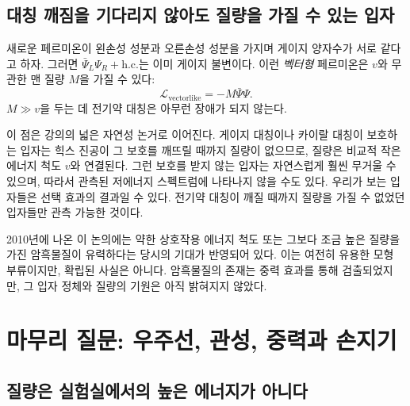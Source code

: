 \subsection{대칭 깨짐을 기다리지 않아도 질량을 가질 수 있는 입자}

새로운 페르미온이 왼손성 성분과 오른손성 성분을 가지며 게이지 양자수가 서로 같다고 하자. 그러면
\(\bar\Psi_L\Psi_R+\mathrm{h.c.}\)는 이미 게이지 불변이다. 이런 \emph{벡터형} 페르미온은 \(v\)와 무관한 맨 질량 \(M\)을 가질 수 있다:
\begin{equation}
  \mathcal L_{\mathrm{vectorlike}}
  =-M\bar\Psi\Psi.
  \label{eq:l09-vectorlike-mass}
\end{equation}
\(M\gg v\)을 두는 데 전기약 대칭은 아무런 장애가 되지 않는다.

이 점은 강의의 넓은 자연성 논거로 이어진다. 게이지 대칭이나 카이랄 대칭이 보호하는 입자는 힉스 진공이 그 보호를 깨뜨릴 때까지 질량이 없으므로, 질량은 비교적 작은 에너지 척도 \(v\)와 연결된다. 그런 보호를 받지 않는 입자는 자연스럽게 훨씬 무거울 수 있으며, 따라서 관측된 저에너지 스펙트럼에 나타나지 않을 수도 있다. 우리가 보는 입자들은 선택 효과의 결과일 수 있다. 전기약 대칭이 깨질 때까지 질량을 가질 수 없었던 입자들만 관측 가능한 것이다.

\begin{classroomqa}
\end{classroomqa}

2010년에 나온 이 논의에는 약한 상호작용 에너지 척도 또는 그보다 조금 높은 질량을 가진 암흑물질이 유력하다는 당시의 기대가 반영되어 있다. 이는 여전히 유용한 모형 부류이지만, 확립된 사실은 아니다. 암흑물질의 존재는 중력 효과를 통해 검출되었지만, 그 입자 정체와 질량의 기원은 아직 밝혀지지 않았다.

\section{마무리 질문: 우주선, 관성, 중력과 손지기}

\subsection{질량은 실험실에서의 높은 에너지가 아니다}


